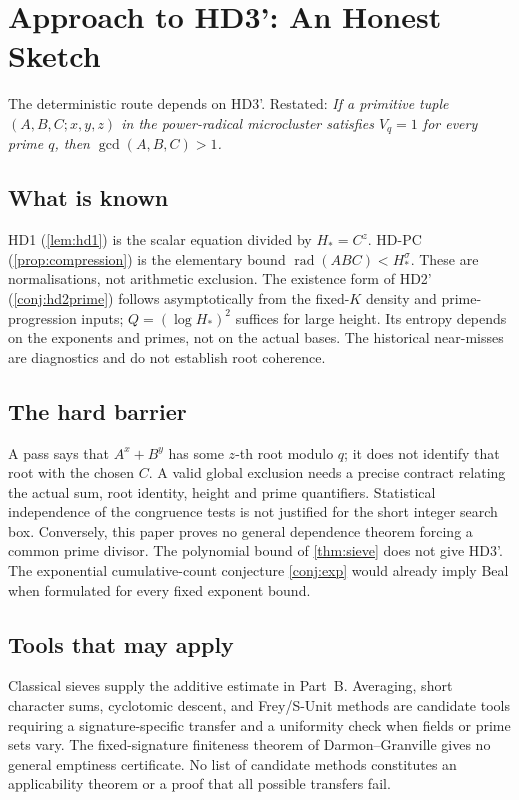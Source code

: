 \documentclass[11pt,a4paper]{article}
\DeclareMathOperator{\rad}{rad}
\begin{document}
\section{Approach to HD3': An Honest Sketch}
\label{sec:hd3-approach}

The deterministic route depends on HD3'. Restated: \emph{If
a primitive tuple $(A,B,C;x,y,z)$ in the power-radical microcluster
satisfies $V_q = 1$ for every prime $q$, then $\gcd(A,B,C) > 1$.}

\subsection*{What is known}

HD1 (\cref{lem:hd1}) is the scalar equation divided by $H_*=C^z$.
HD-PC (\cref{prop:compression}) is the elementary bound
$\rad(ABC)<H_*^\sigma$. These are normalisations, not arithmetic
exclusion. The existence form of HD2' (\cref{conj:hd2prime}) follows
asymptotically from the fixed-$K$ density and prime-progression inputs;
$Q=(\log H_*)^2$ suffices for large height. Its entropy depends on
the exponents and primes, not on the actual bases. The historical
near-misses are diagnostics and do not establish root coherence.

\subsection*{The hard barrier}

A pass says that $A^x+B^y$ has some $z$-th root modulo $q$;
it does not identify that root with the chosen $C$.
A valid global exclusion needs a precise contract relating the actual
sum, root identity, height and prime quantifiers. Statistical
independence of the congruence tests is not justified for the short
integer search box. Conversely, this paper proves no general
dependence theorem forcing a common prime divisor.
The polynomial bound of \cref{thm:sieve} does not give HD3'.
The exponential cumulative-count conjecture \cref{conj:exp} would
already imply Beal when formulated for every fixed exponent bound.

\subsection*{Tools that may apply}

Classical sieves supply the additive estimate in Part~B.
Averaging, short character sums, cyclotomic descent, and Frey/S-Unit
methods are candidate tools requiring a signature-specific transfer
and a uniformity check when fields or prime sets vary.
The fixed-signature finiteness theorem of Darmon--Granville
\cite{DarmonGranville1995} gives no general emptiness certificate.
No list of candidate methods constitutes an applicability theorem or
a proof that all possible transfers fail.
\end{document}
